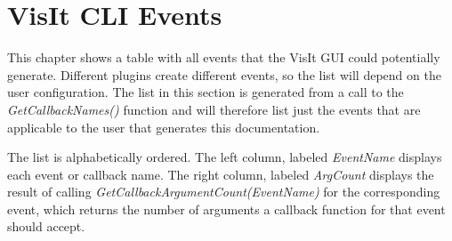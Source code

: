 \documentclass[letterpaper,10pt,english]{sphinxmanual}
\begin{document}
\begin{DUlineblock}{0em}
\item[] 
\end{DUlineblock}


\chapter{VisIt CLI Events}
\label{events::doc}\label{events:visit-cli-events}\label{events:visit}
This chapter shows a table with all events that the VisIt GUI could
potentially generate. Different plugins create different events, so the
list will depend on the user configuration. The list in this section is
generated from a call to the \emph{GetCallbackNames()} function and will
therefore list just the events that are applicable to the user that
generates this documentation.

The list is alphabetically ordered. The left column, labeled \emph{EventName}
displays each event or callback name. The right column, labeled
\emph{ArgCount} displays the result of calling
\emph{GetCallbackArgumentCount(EventName)} for the corresponding event, which
returns the number of arguments a callback function for that event
should accept.
\textbar{}
\textbar{}
\end{document}
